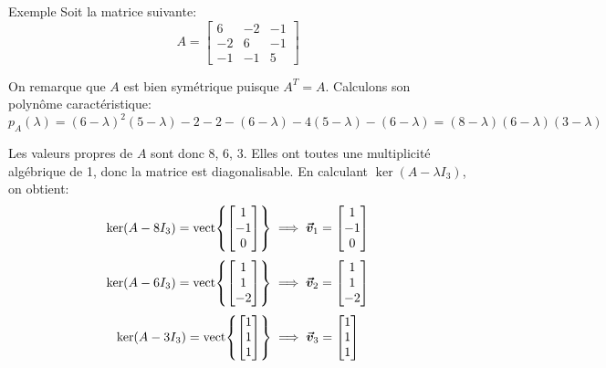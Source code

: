 \documentclass[a4paper]{article}
\begin{document}
\begin{parag}{Exemple}
    Soit la matrice suivante:
    \[A = \begin{bmatrix} 6 & -2 & -1 \\ -2 & 6 & -1 \\ -1 & -1 & 5 \end{bmatrix} \]

    On remarque que $A$ est bien symétrique puisque $A^T = A$. Calculons son polynôme caractéristique:
    \[p_A\left(\lambda\right) =\left(6 -\lambda\right)^2\left(5 - \lambda\right) -2 -2 - \left(6 -\lambda\right) - 4\left(5 - \lambda\right) - \left(6 - \lambda\right) = \left(8 - \lambda\right)\left(6 - \lambda\right)\left(3 - \lambda\right)\]

    Les valeurs propres de $A$ sont donc 8, 6, 3. Elles ont toutes une multiplicité algébrique de 1, donc la matrice est diagonalisable. En calculant $\ker\left(A - \lambda I_3\right)$, on obtient:
    \[\ker\left(A - 8 I_3\right) = \vect\left\{\begin{bmatrix} 1 \\ -1 \\ 0 \end{bmatrix} \right\} \implies \bvec{v}_1 = \begin{bmatrix} 1 \\ -1 \\ 0 \end{bmatrix}  \]
    \[\ker\left(A - 6 I_3\right) = \vect\left\{\begin{bmatrix} 1 \\ 1 \\ -2 \end{bmatrix} \right\} \implies \bvec{v}_2 = \begin{bmatrix} 1 \\ 1 \\ -2 \end{bmatrix} \]
    \[\ker\left(A - 3 I_3\right) = \vect\left\{\begin{bmatrix} 1 \\ 1 \\ 1 \end{bmatrix} \right\} \implies \bvec{v}_3 = \begin{bmatrix} 1 \\ 1 \\ 1 \end{bmatrix} \]


\end{parag}
\end{document}
